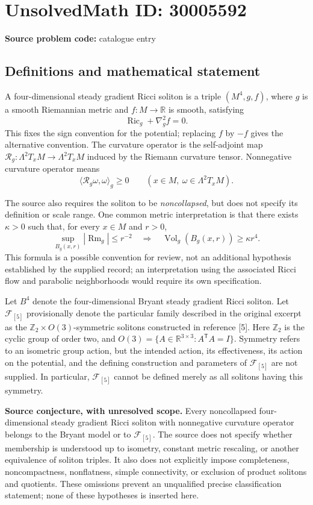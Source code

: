 \documentclass[11pt]{article}
\newcommand{\Z}{\mathbb{Z}}
\newcommand{\R}{\mathbb{R}}
\begin{document}
\section*{UnsolvedMath ID: 30005592}
\textbf{Source problem code:} catalogue entry
\subsection{Definitions and mathematical statement}
A four-dimensional steady gradient Ricci soliton is a triple \((M^4,g,f)\), where \(g\) is a smooth Riemannian metric and \(f\colon M\to\R\) is smooth, satisfying
\[
\operatorname{Ric}_g+\nabla_g^2 f=0.
\]
This fixes the sign convention for the potential; replacing \(f\) by \(-f\) gives the alternative convention. The curvature operator is the self-adjoint map \(\mathcal R_g\colon\Lambda^2T_xM\to\Lambda^2T_xM\) induced by the Riemann curvature tensor. Nonnegative curvature operator means
\[
\langle\mathcal R_g\omega,\omega\rangle_g\geq0
\qquad(x\in M,\ \omega\in\Lambda^2T_xM).
\]

The source also requires the soliton to be \emph{noncollapsed}, but does not specify its definition or scale range. One common metric interpretation is that there exists \(\kappa>0\) such that, for every \(x\in M\) and \(r>0\),
\[
\sup_{B_g(x,r)}|\operatorname{Rm}_g|\leq r^{-2}
\quad\Longrightarrow\quad
\operatorname{Vol}_g(B_g(x,r))\geq\kappa r^4.
\]
This formula is a possible convention for review, not an additional hypothesis established by the supplied record; an interpretation using the associated Ricci flow and parabolic neighborhoods would require its own specification.

Let \(B^4\) denote the four-dimensional Bryant steady gradient Ricci soliton. Let \(\mathcal F_{[5]}\) provisionally denote the particular family described in the original excerpt as the \(\Z_2\times O(3)\)-symmetric solitons constructed in reference [5]. Here \(\Z_2\) is the cyclic group of order two, and \(O(3)=\{A\in\R^{3\times3}:A^{\mathsf T}A=I\}\). Symmetry refers to an isometric group action, but the intended action, its effectiveness, its action on the potential, and the defining construction and parameters of \(\mathcal F_{[5]}\) are not supplied. In particular, \(\mathcal F_{[5]}\) cannot be defined merely as all solitons having this symmetry.

\textbf{Source conjecture, with unresolved scope.} Every noncollapsed four-dimensional steady gradient Ricci soliton with nonnegative curvature operator belongs to the Bryant model or to \(\mathcal F_{[5]}\). The source does not specify whether membership is understood up to isometry, constant metric rescaling, or another equivalence of soliton triples. It also does not explicitly impose completeness, noncompactness, nonflatness, simple connectivity, or exclusion of product solitons and quotients. These omissions prevent an unqualified precise classification statement; none of these hypotheses is inserted here.
\end{document}
